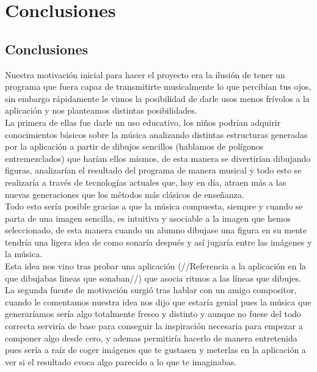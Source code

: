 \chapter{Conclusiones}





\section{Conclusiones}


Nuestra motivación inicial para hacer el proyecto era la ilusión de tener un programa que fuera capaz de transmitirte musicalmente lo que percibían tus ojos, sin embargo rápidamente le vimos la posibilidad de darle usos menos frívolos a la aplicación y nos planteamos distintas posibilidades.
\newline
\\La primera de ellas fue darle un uso educativo, los niños podrían adquirir conocimientos básicos sobre la música analizando distintas estructuras generadas por la aplicación a partir de dibujos sencillos (hablamos de polígonos entremezclados) que harían ellos mismos, de esta manera se divertirían dibujando figuras, analizarían el resultado del programa de manera musical y todo esto se realizaría a través de tecnologías actuales que,  hoy en día, atraen más a las nuevas generaciones que los métodos más clásicos de enseñanza.
\newline
\\Todo esto sería posible gracias a que la música compuesta, siempre y cuando se parta de una imagen sencilla, es intuitiva y asociable a la imagen que hemos seleccionado, de esta manera cuando un alumno dibujase una figura en su mente tendría una ligera idea de como sonaría después y así jugaría entre las imágenes y la música.
\\Esta idea nos vino tras probar una aplicación (//Referencia a la aplicación en la que dibujabas lineas que sonaban//) que asocia ritmos a las líneas que dibujes.
\newline
\\La segunda fuente de motivación surgió tras hablar con un amigo compositor, cuando le comentamos nuestra idea nos dijo que estaría genial pues la música que generaríamos sería algo totalmente fresco y distinto y aunque no fuese del todo correcta serviría de base para conseguir la inspiración necesaria para empezar a componer algo desde cero, y ademas permitiría hacerlo de manera entretenida pues sería  a raíz de coger imágenes que te gustasen y meterlas en la aplicación a ver si el resultado evoca algo parecido a lo que te imaginabas.
